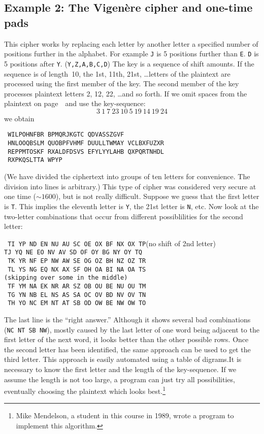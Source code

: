 \subsection*{Example 2: The Vigen\`ere cipher and one-time pads}
This cipher works by replacing each letter by another letter a 
specified number of positions further in the alphabet.  For example
{\tt J} is 5 positions further than {\tt E}.  {\tt D} is 5 positions
after {\tt Y}.  ({\tt Y,Z,A,B,C,D})  The key is a sequence of 
shift amounts.  If the sequence is of length~10, the 1st, 11th, 21st,
\dots letters of the plaintext are processed using the first member
of the key.  The second member of the key processes plaintext letters
2, 12, 22, \dots and so forth.  If we omit spaces from the plaintext
on page~\pageref{pl}\  and use the key-sequence:$$3\ 1\ 7\ 23\ 10\ 5\ 19\ 14\ 
19\ 24$$we obtain \begin{lst} \tt
WILPOHNFBR BPMQRJKGTC QDVASSZGVF\\ \tt
HNLOOQBSLM QUOBPFVHMF DUULLTWMAY VCLBXFUZXR\\ \tt
REPPMTOSKF RXALDFDSVS EFYLYYLAHB QXPQRTNHDL\\ \tt
RXPKQSLTTA WPYP\end{lst}
(We have divided the ciphertext into groups of ten letters for
convenience.  The division into lines is arbitrary.)
\pq This type of cipher was considered very secure at one time
($\sim1600$), but is not really difficult.  Suppose we guess that
the first letter is {\tt T}.  This implies the eleventh letter 
is {\tt Y}, the 21st letter is {\tt N}, etc.  Now look at the
two-letter combinations that occur from different possiblilities for the
second letter:\begin{lst}{\tt
TI YP ND EN NU AU SC OE OX BF NX OX TP}\quad(no shift of 2nd letter)\\
\tt TJ YQ NE EO NV AV SD OF OY BG NY OY TQ\\ \tt
TK YR NF EP NW AW SE OG OZ BH NZ OZ TR\\ \tt
TL YS NG EQ NX AX SF OH OA BI NA OA TS\\
\quad(skipping over some in the middle)\\ \tt
TF YM NA EK NR AR SZ OB OU BE NU OU TM\\ \tt
TG YN NB EL NS AS SA OC OV BD NV OV TN\\ \tt
TH YO NC EM NT AT SB OD OW BE NW OW TO\end{lst}
The last line is the ``right answer.''  Although it shows several
bad combinations ({\tt NC NT SB NW}), mostly caused by the last
letter of one word being adjacent to the first letter of the next
word, it looks better than the other possible rows.  Once the
second letter has been identified, the same approach can be used
to get the third letter. This approach is easily automated using
a table of digrams.\pq It is necessary to know the first letter
and the length of the key-sequence. If we assume the length is
not too large, a program can just try all possibilities, eventually
choosing the plaintext which looks best.\footnote{Mike Mendelson,
a student in this course in 1989, wrote a program to implement this algorithm.}
